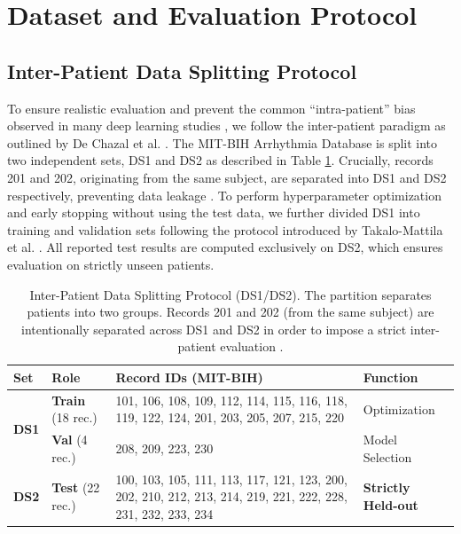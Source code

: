 \documentclass[pdflatex,sn-mathphys-num]{sn-jnl}
\theoremstyle{thmstyleone}
\theoremstyle{thmstyletwo}
\theoremstyle{thmstylethree}
\begin{document}
\section{Dataset and Evaluation Protocol}

\subsection{Inter-Patient Data Splitting Protocol}
To ensure realistic evaluation and prevent the common ``intra-patient'' bias observed in many deep learning studies \cite{bahrami_investigation_2025, xiao_deep_2023}, we follow the inter-patient paradigm as outlined by De Chazal et al. \cite{chazal_automatic_2004}. The MIT-BIH Arrhythmia Database is split into two independent sets, DS1 and DS2 as described in Table \ref{tab:split_protocol}. Crucially, records 201 and 202, originating from the same subject, are separated into DS1 and DS2 respectively, preventing data leakage \cite{xiao_deep_2023}. To perform hyperparameter optimization and early stopping without using the test data, we further divided DS1 into training and validation sets following the protocol introduced by Takalo-Mattila et al. \cite{takalo-mattila_inter-patient_2018}. All reported test results are computed exclusively on DS2, which ensures evaluation on strictly unseen patients.

\begin{table}[ht]
\caption{Inter-Patient Data Splitting Protocol (DS1/DS2). The partition separates patients into two groups. Records 201 and 202 (from the same subject) are intentionally separated across DS1 and DS2 in order to impose a strict inter-patient evaluation \cite{farag_tiny_2023}.}
\label{tab:split_protocol}
\centering
\footnotesize 
\begin{tabular}{@{}l l p{6.5cm} l@{}} 
\toprule
\textbf{Set} & \textbf{Role} & \textbf{Record IDs (MIT-BIH)} & \textbf{Function} \\ \midrule
\multirow{2}{*}{\textbf{DS1}} & \textbf{Train} (18 rec.) & 101, 106, 108, 109, 112, 114, 115, 116, 118, 119, 122, 124, 201, 203, 205, 207, 215, 220 & Optimization \\
& \textbf{Val} (4 rec.) & 208, 209, 223, 230 & Model Selection \\ \midrule
\textbf{DS2} & \textbf{Test} (22 rec.) & 100, 103, 105, 111, 113, 117, 121, 123, 200, 202, 210, 212, 213, 214, 219, 221, 222, 228, 231, 232, 233, 234 & \textbf{Strictly Held-out} \\ \bottomrule
\end{tabular}
\end{table}
\end{document}
